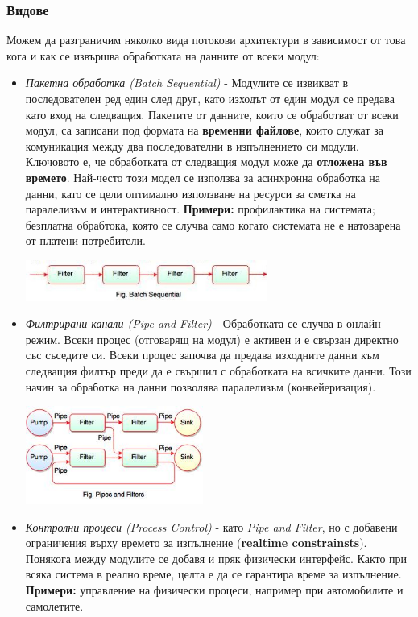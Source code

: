 \documentclass[fleqn,12pt]{article}
\begin{document}
\subsubsection{Видове}
Можем да разграничим няколко вида потокови архитектури в зависимост от това кога и как се извършва обработката на данните от всеки модул:
\begin{itemize}
    \item \textit{Пакетна обработка (Batch Sequential)} - Модулите се извикват в последователен ред един след друг, като изходът от един модул се предава като вход на следващия.
    Пакетите от данните, които се обработват от всеки модул, са записани под формата на \textbf{временни файлове}, които служат за комуникация между два последователни в изпълнението си модули. 
    Ключовото е, че обработката от следващия модул може да \textbf{отложена във времето}.
    Най-често този модел се използва за асинхронна обработка на данни, като се цели оптимално използване на ресурси за сметка на паралелизъм и интерактивност.
    \textbf{Примери: } профилактика на системата; безплатна обрабтока, която се случва само когато системата не е натоварена от платени потребители.
    \begin{center} \includegraphics[width=300px]{batch_sequential.jpg} \end{center}
    \item \textit{Филтрирани канали (Pipe and Filter)} - Обработката се случва в онлайн режим. Всеки процес (отговарящ на модул) е активен
    и е свързан директно със съседите си. Всеки процес започва да предава изходните данни към следващия филтър преди да е свършил с обработката на всичките данни.
    Този начин за обработка на данни позволява паралелизъм (конвейеризация).
    \begin{center} \includegraphics[width=220px]{pipe_and_filter.jpg} \end{center}
    \item \textit{Контролни процеси (Process Control)} - като \textit{Pipe and Filter}, но с добавени ограничения върху времето за изпълнение (\textbf{realtime constrainsts}).
    Понякога между модулите се добавя и пряк физически интерфейс. Както при всяка система в реално време, целта е да се гарантира време за изпълнение.
    \textbf{Примери: } управление на физически процеси, например при автомобилите и самолетите.
\end{itemize}
\end{document}
